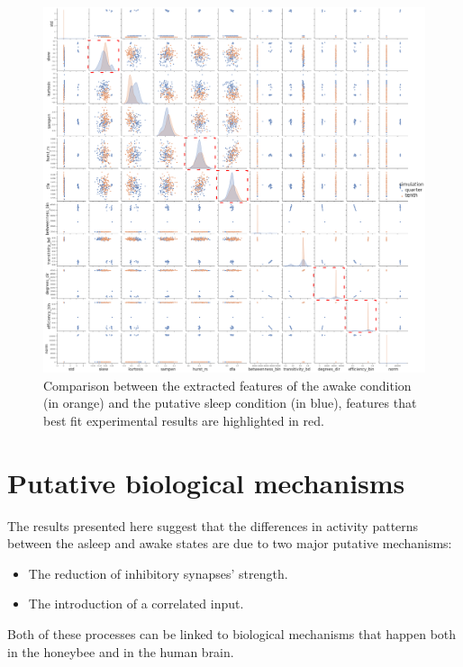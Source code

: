 \begin{figure}
  \centering
  \includegraphics[width=\textwidth]{feature-comparison-quarter-normal}
  \caption{Comparison between the extracted features of the awake condition (in orange) and the putative sleep condition (in blue), features that best fit experimental results are highlighted in red.}
  \label{fig:feature_comparison}
\end{figure}

\section{Putative biological mechanisms}
The results presented here suggest that the differences in activity patterns between the asleep and awake states are due to two major putative mechanisms:

\begin{itemize}
  \item The reduction of inhibitory synapses' strength.
  \item The introduction of a correlated input.
\end{itemize}

Both of these processes can be linked to biological mechanisms that happen both in the honeybee and in the human brain.

